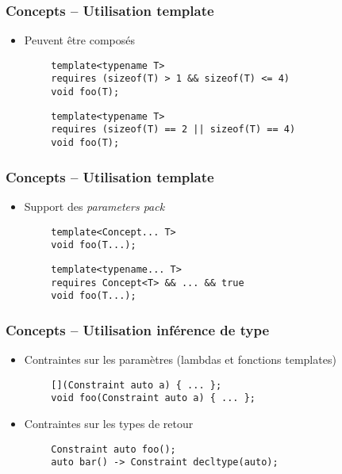 \documentclass[C++.tex]{subfiles}
\begin{document}
\begin{frame}[fragile]
	\frametitle{Concepts -- Utilisation template}
	\begin{itemize}
		\item Peuvent être composés
	\end{itemize}

	\begin{verbatim}
		template<typename T>
		requires (sizeof(T) > 1 && sizeof(T) <= 4)
		void foo(T);
	\end{verbatim}

	\begin{verbatim}
		template<typename T>
		requires (sizeof(T) == 2 || sizeof(T) == 4)
		void foo(T);
	\end{verbatim}
\end{frame}

\begin{frame}[fragile]
	\frametitle{Concepts -- Utilisation template}
	\begin{itemize}
		\item Support des \textit{parameters pack}
	\end{itemize}

	\begin{verbatim}
		template<Concept... T>
		void foo(T...);
	\end{verbatim}

	\begin{verbatim}
		template<typename... T>
		requires Concept<T> && ... && true
		void foo(T...);
	\end{verbatim}
\end{frame}

\begin{frame}[fragile]
	\frametitle{Concepts -- Utilisation inférence de type}
	\begin{itemize}
		\item Contraintes sur les paramètres (lambdas et fonctions templates)
	\end{itemize}

	\begin{verbatim}
		[](Constraint auto a) { ... };
		void foo(Constraint auto a) { ... };
	\end{verbatim}

	\begin{itemize}
		\item Contraintes sur les types de retour
	\end{itemize}

	\begin{verbatim}
		Constraint auto foo();
		auto bar() -> Constraint decltype(auto);
	\end{verbatim}
\end{frame}
\end{document}

